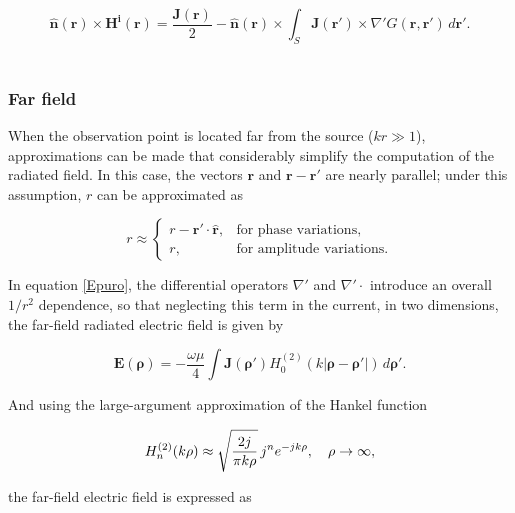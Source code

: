 \documentclass[11pt,a4paper,twoside,pdf]{article}
\numberwithin{equation}{section}
\begin{document}
\begin{equation}
\bm{\mathbf{\hat{n}}}(\bm{r}) \times \mathbf{H^i}(\mathbf{r})
= \frac{\bm{J(\mathbf{r})}}{2} - \mathbf{\hat{n}} (\mathbf{r}) \times  \int_{S}
 \mathbf{J}(\mathbf{r}') \times \nabla'
G(\mathbf{r},\mathbf{r}')
\, d\bm{r'}.
\label{MFIE}
\end{equation}\\



\subsubsection{Far field}



When the observation point is located far from the source ($kr \gg 1$), approximations can be made that considerably simplify the computation of the radiated field. In this case, the vectors $\mathbf{r}$ and $\mathbf{r}-\mathbf{r}'$ are nearly parallel; under this assumption, $r$ can be approximated as \cite{martin2021campo}

\begin{equation}
r \approx
\begin{cases}
r - \mathbf{r}' \cdot \hat{\mathbf{r}}, & \text{for phase variations}, \\
r, & \text{for amplitude variations}.
\end{cases}
\label{eq:farfield_r}
\end{equation}

In equation \ref{Epuro}, the differential operators $\nabla'$ and $\nabla' \cdot$ introduce an overall $1/r^2$ dependence, so that neglecting this term in the current, in two dimensions, the far-field radiated electric field is given by

\begin{equation}
\mathbf{E}(\boldsymbol{\rho})
=
- \frac{\omega \mu}{4}
\int
\mathbf{J}(\boldsymbol{\rho}')
H_0^{(2)}\left(k|\boldsymbol{\rho}-\boldsymbol{\rho}'|\right)
\, d\boldsymbol{\rho}'.
\label{eq:farfield_2D}
\end{equation}

And using the large-argument approximation of the Hankel function

\begin{equation}
H_n^{(2)}(k\rho)
\approx
\sqrt{\frac{2j}{\pi k\rho}}
\, j^n e^{-jk\rho},
\quad \rho \rightarrow \infty,
\notag
\end{equation}

the far-field electric field is expressed as
\end{document}
